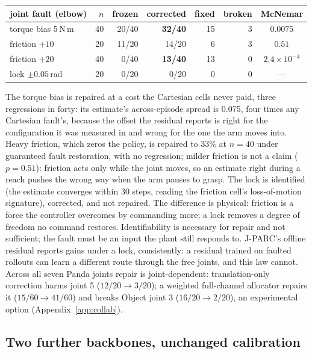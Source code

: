 \documentclass{article}
\begin{document}
\begin{center}\small
\begin{tabular}{lrrrrrc}
\toprule
joint fault (elbow) & $n$ & frozen & corrected & fixed & broken & McNemar \\
\midrule
torque bias 5\,N\,m & 40 & 20/40 & \textbf{32/40} & 15 & 3 & $0.0075$ \\
friction $+10$ & 20 & 11/20 & 14/20 & 6 & 3 & $0.51$ \\
friction $+20$ & 40 & 0/40 & \textbf{13/40} & 13 & 0 & $2.4\times10^{-4}$ \\
lock $\pm0.05$\,rad & 20 & 0/20 & 0/20 & 0 & 0 & --- \\
\bottomrule
\end{tabular}
\end{center}

The torque bias is repaired at a cost the Cartesian cells never paid, three regressions in
forty: its estimate's across-episode spread is 0.075, four times any Cartesian fault's,
because the offset the residual reports is right for the configuration it was measured in
and wrong for the one the arm moves into. Heavy friction, which zeros the policy, is
repaired to $33\%$ at $n=40$ under guaranteed fault restoration, with no regression; milder friction is not a claim ($p=0.51$): friction
acts only while the joint moves, so an estimate right during a reach pushes the wrong way
when the arm pauses to grasp. The lock is identified (the estimate converges within 30
steps, reading the friction cell's loss-of-motion signature), corrected, and not repaired.
The difference is physical: friction is a force the controller overcomes by commanding
more; a lock removes a degree of freedom no command restores. Identifiability is necessary
for repair and not sufficient; the fault must be an input the plant still responds to.
J-PARC's offline residual reports gains under a lock, consistently: a residual trained on
faulted rollouts can learn a different route through the free joints, and this law cannot.
Across all seven Panda joints repair is joint-dependent: translation-only correction harms
joint 5 ($12/20\to3/20$); a weighted full-channel allocator repairs it ($15/60\to41/60$) and
breaks Object joint 3 ($16/20\to2/20$), an experimental option (Appendix~\ref{app:collab}).

\subsection{Two further backbones, unchanged calibration}
\label{sec:oft}
\end{document}
